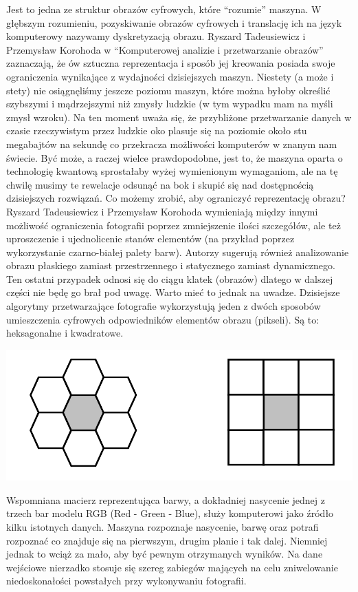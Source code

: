 \documentclass{article}
\begin{document}
Jest to jedna ze struktur obrazów cyfrowych, które “rozumie” maszyna. W głębszym rozumieniu, pozyskiwanie obrazów cyfrowych i translację ich na język komputerowy nazywamy dyskretyzacją obrazu. Ryszard Tadeusiewicz i Przemysław Korohoda w “Komputerowej analizie i przetwarzanie obrazów” \cite{ref14} zaznaczają, że ów sztuczna reprezentacja i sposób jej kreowania posiada swoje ograniczenia wynikające z wydajności dzisiejszych maszyn. Niestety (a może i stety) nie osiągnęliśmy jeszcze poziomu maszyn, które można byłoby określić szybszymi i mądrzejszymi niż zmysły ludzkie (w tym wypadku mam na myśli zmysł wzroku). Na ten moment uważa się, że przybliżone przetwarzanie danych w czasie rzeczywistym przez ludzkie oko plasuje się na poziomie około stu megabajtów na sekundę co przekracza możliwości komputerów w znanym nam świecie. Być może, a raczej wielce prawdopodobne, jest to, że maszyna oparta o technologię kwantową sprostałaby wyżej wymienionym wymaganiom, ale na tę chwilę musimy te rewelacje odsunąć na bok i skupić się nad dostępnością dzisiejszych rozwiązań. Co możemy zrobić, aby ograniczyć reprezentację obrazu? Ryszard Tadeusiewicz i Przemysław Korohoda wymieniają między innymi możliwość ograniczenia fotografii poprzez zmniejszenie ilości szczegółów, ale też uproszczenie i ujednolicenie stanów elementów (na przykład poprzez wykorzystanie czarno-białej palety barw). Autorzy sugerują również analizowanie obrazu płaskiego zamiast przestrzennego i statycznego zamiast dynamicznego. Ten ostatni przypadek odnosi się do ciągu klatek (obrazów) dlatego w dalszej części nie będę go brał pod uwagę. Warto mieć to jednak na uwadze. Dzisiejsze algorytmy przetwarzające fotografie wykorzystują jeden z dwóch sposobów umieszczenia cyfrowych odpowiedników elementów obrazu (pikseli). Są to: heksagonalne i kwadratowe.
\begin{center}
\includegraphics[width=15cm]{dyskretyzacja}
\end{center}
Wspomniana macierz reprezentująca barwy, a dokładniej nasycenie jednej z trzech bar modelu RGB (Red - Green - Blue), służy komputerowi jako źródło kilku istotnych danych. Maszyna rozpoznaje nasycenie, barwę oraz potrafi rozpoznać co znajduje się na pierwszym, drugim planie i tak dalej. Niemniej jednak to wciąż za mało, aby być pewnym otrzymanych wyników. Na dane wejściowe nierzadko stosuje się szereg zabiegów mających na celu zniwelowanie niedoskonałości powstałych przy wykonywaniu fotografii.
\end{document}
